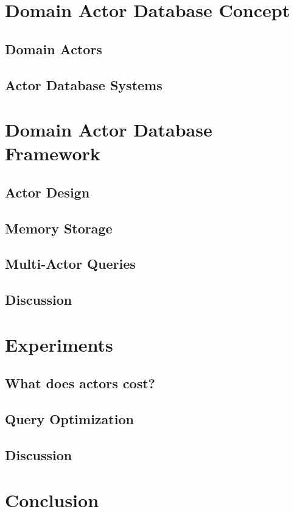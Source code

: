 \section{Domain Actor Database Concept}
  
  \subsection{Domain Actors}\label{sec:dactors}
  
  \subsection{Actor Database Systems}\label{sec:actor_database_systems}

\section{Domain Actor Database Framework}\label{sec:framework}
  \subsection{Actor Design}

  \subsection{Memory Storage}

  \subsection{Multi-Actor Queries}
  
  \subsection{Discussion}

\section{Experiments}\label{sec:experiments}

  \subsection{What does actors cost?}

  \subsection{Query Optimization}
  
  \subsection{Discussion}

\section{Conclusion}\label{sec:conclusion}